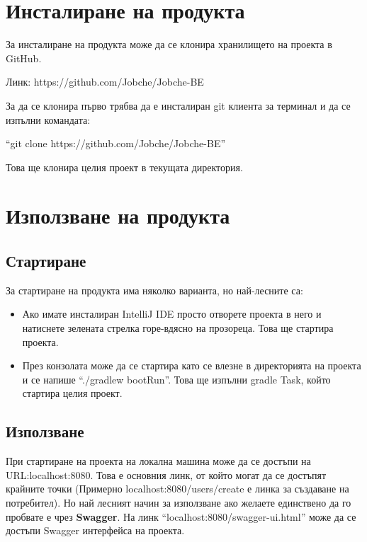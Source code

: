 \section{Инсталиране на продукта}

За инсталиране на продукта може да се клонира хранилището на проекта в GitHub.

Линк: https://github.com/Jobche/Jobche-BE

За да се клонира първо трябва да е инсталиран git клиента за терминал и да се изпълни командата:

``git clone https://github.com/Jobche/Jobche-BE''

Това ще клонира целия проект в текущата директория.

\section{Използване на продукта}

\subsection{Стартиране}
За стартиране на продукта има няколко варианта, но най-лесните са:
\begin{itemize}
    \item Ако имате инсталиран IntelliJ IDE просто отворете проекта в него и натиснете зелената стрелка горе-вдясно на прозореца. Това ще стартира проекта.
    \item През конзолата може да се стартира като се влезне в директорията на проекта и се напише ``./gradlew bootRun''. Това ще изпълни gradle Task, който стартира целия проект.
\end{itemize}

\subsection{Използване}
При стартиране на проекта на локална машина може да се достъпи на URL:localhost:8080. Това е основния линк, от който могат да се достъпят крайните точки (Примерно localhost:8080/users/create е линка за създаване на потребител). Но най лесният начин за използване ако желаете единствено да го пробвате е чрез \textbf{Swagger}.
На линк ``localhost:8080/swagger-ui.html'' може да се достъпи Swagger интерфейса на проекта.

\begin{figure}[h]
    \centering
    \caption{}
    \label{fig:swagger_ui}
\end{figure}

